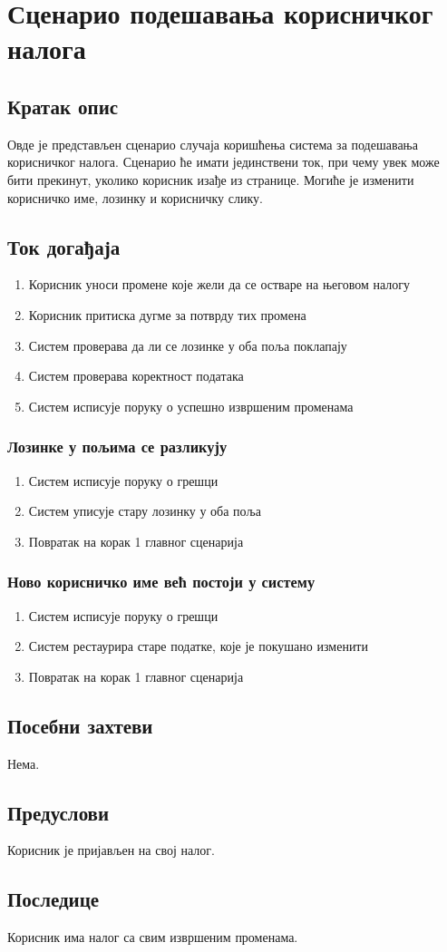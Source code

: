 \section{Сценарио подешавања корисничког налога}

\subsection{Кратак опис}
Овде је представљен сценарио случаја коришћења система за подешавања корисничког налога.
Сценарио ће имати јединствени ток, при чему увек може бити прекинут, уколико корисник изађе из
странице. Могиће је изменити корисничко име, лозинку и корисничку слику.

\subsection{Ток догађаја}
\begin{enumerate}
	\item Корисник уноси промене које жели да се остваре на његовом налогу
	\item Корисник притиска дугме за потврду тих промена
	\item Систем проверава да ли се лозинке у оба поља поклапају
	\item Систем проверава коректност података
	\item Систем исписује поруку о успешно извршеним променама
\end{enumerate}

\subsubsection{Лозинке у пољима се разликују}
\begin{enumerate}[label=4.\arabic*]
	\item Систем исписује поруку о грешци
	\item Систем уписује стару лозинку у оба поља
	\item Повратак на корак 1 главног сценарија
\end{enumerate}

\subsubsection{Ново корисничко име већ постоји у систему}
\begin{enumerate}[label=5.\arabic*]
	\item Систем исписује поруку о грешци
	\item Систем рестаурира старе податке, које је покушано изменити
	\item Повратак на корак 1 главног сценарија
\end{enumerate}

\subsection{Посебни захтеви}
Нема.

\subsection{Предуслови}
Корисник је пријављен на свој налог.

\subsection{Последице}
Корисник има налог са свим извршеним променама.

